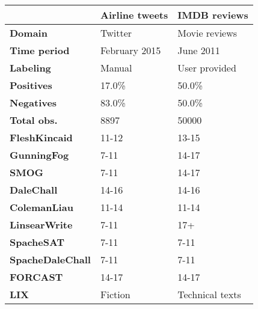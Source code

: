 \begin{tabular}{|l|l|l|} \cline{2-3}
\multicolumn{1}{c|}{} & \textbf{Airline tweets} & \textbf{IMDB reviews} \\ \hline
\textbf{Domain} & Twitter & Movie reviews \\ \hline
\textbf{Time period} & February 2015 & June 2011 \\ \hline
\textbf{Labeling} & Manual & User provided \\ \Xhline{3\arrayrulewidth}
\textbf{Positives} & 17.0\% & 50.0\% \\ \hline
\textbf{Negatives} & 83.0\% & 50.0\% \\ \hline
\textbf{Total obs.} & 8897 & 50000 \\ \Xhline{3\arrayrulewidth}
\textbf{FleshKincaid} & 11-12 & 13-15 \\ \hline
\textbf{GunningFog} & 7-11 & 14-17 \\ \hline
\textbf{SMOG} & 7-11 & 14-17 \\ \hline
\textbf{DaleChall} & 14-16 & 14-16 \\ \hline
\textbf{ColemanLiau} & 11-14 & 11-14 \\ \hline
\textbf{LinsearWrite} & 7-11 & 17+ \\ \hline
\textbf{SpacheSAT} & 7-11 & 7-11 \\ \hline
\textbf{SpacheDaleChall} & 7-11 & 7-11 \\ \hline
\textbf{FORCAST} & 14-17 & 14-17 \\ \hline
\textbf{LIX} & Fiction & Technical \newline texts \\ \hline
\end{tabular}